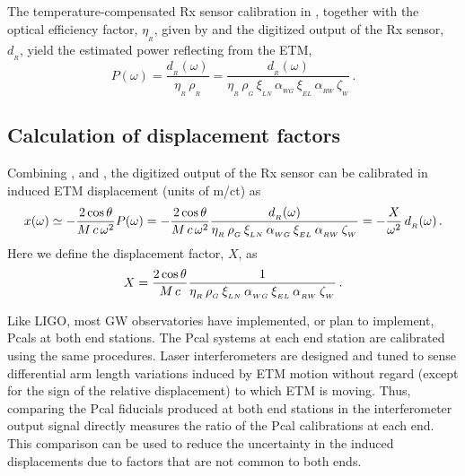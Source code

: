 \documentclass[12pt,a4paper,final]{iopart}
\begin{document}
The temperature-compensated Rx sensor calibration in , together with the optical efficiency factor, $\eta_{_{R}}$, given by  and the digitized output of the Rx sensor, $d_{_{R}}$, yield the estimated power reflecting from the ETM, 
\begin{equation}
\label{eq:powerCal}
  P(\omega)  = \frac{d_{_{R}}(\omega)}{\eta_{_{R}} \, \rho_{_{R}}} =\frac{d_{_{R}}(\omega)}
  {\eta_{_{R}} \, \rho_{_{G}} \, \xi_{_{LN}} \, \alpha_{_{WG}} \, \xi_{_{EL}} \, \alpha_{_{RW}} \, \zeta_{_{W}}}\, .
\end{equation}
\subsection{Calculation of displacement factors}
\label{subsec:MethodCalcs}
%
Combining , and , the digitized output of the Rx sensor can be calibrated in induced ETM displacement (units of m/ct) as
%
\begin{equation}
\label{eq:disp_eq}
  x(\omega)  \simeq - \frac{2 \, \rm cos\,\theta}{M \, c \, \omega^2} P(\omega) = - \frac{2 \, \rm cos\,\theta}{M \, c \, \omega^2} \frac{d_{_{R}}(\omega)}
  {\eta_{_{R}} \, \rho_{_{G}} \, \xi_{_{LN}} \, \alpha_{_{WG}} \, \xi_{_{EL}} \, \alpha_{_{RW}} \, \zeta_{_{W}}}  = - \frac{X}{\omega^2}\, d_{_{R}}(\omega)\,.
\end{equation}
%
Here  we define the displacement factor, $X$, as 
%
\begin{equation}
 X =  \frac{2 \, \rm cos\,\theta}{M \, c} \frac{1}
  {\eta_{_{R}} \, \rho_{_{G}} \, \xi_{_{LN}} \, \alpha_{_{WG}} \, \xi_{_{EL}} \, \alpha_{_{RW}} \, \zeta_{_{W}}}\, .
\label{eq:disp_eqn}
\end{equation}
%

Like LIGO, most GW observatories have implemented, or plan to implement, Pcals at both end stations. The Pcal systems at each end station are calibrated using the same procedures.  Laser interferometers are designed and tuned to sense differential arm length variations induced by ETM motion without regard (except for the sign of the relative displacement) to which ETM is moving.   Thus, comparing the Pcal fiducials produced at both end stations in the interferometer output signal directly measures the ratio of the Pcal calibrations at each end.  This comparison can be used to reduce the uncertainty in the induced displacements due to factors that are not common to both ends.
\end{document}

